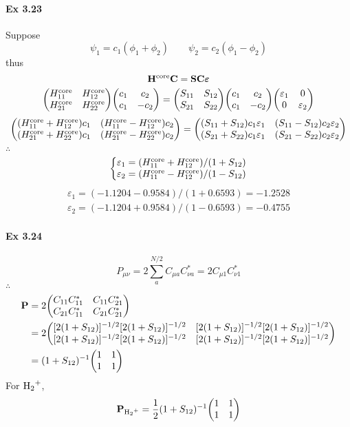 \documentclass[a4paper]{article}
\DeclareMathOperator{\core}{\mathrm{core}}
\newcommand{\ex}[1]{\paragraph{Ex #1}}
\numberwithin{equation}{subsection}
\begin{document}
\ex{3.23}
Suppose
\begin{equation}\label{key}
\psi_1 = c_1 (\phi_1 + \phi_2) \qquad \psi_2 = c_2 (\phi_1 - \phi_2)
\end{equation}
thus
\begin{equation}\label{key}
\vb{H}^{\core} \vb{C} = \vb{S} \vb{C} \bm\varepsilon
\end{equation}
\begin{equation}\label{key}
\mqty(H_{11}^{\core} & H_{12}^{\core}\\ H_{21}^{\core} & H_{22}^{\core}) \mqty(c_1 & c_2\\ c_1 & -c_2) = \mqty(S_{11} & S_{12}\\ S_{21} & S_{22}) \mqty(c_1 & c_2\\ c_1 & -c_2) \mqty(\varepsilon_1 & 0\\ 0 &\varepsilon_2 ) 
\end{equation}
\begin{equation}\label{key}
\mqty((H_{11}^{\core} + H_{12}^{\core}) c_1 & (H_{11}^{\core} - H_{12}^{\core}) c_2 \\ 
(H_{21}^{\core} + H_{22}^{\core}) c_1 & (H_{21}^{\core} - H_{22}^{\core})c_2)
= \mqty((S_{11} + S_{12}) c_1\varepsilon_1 & (S_{11} - S_{12}) c_2\varepsilon_2\\
(S_{21} + S_{22}) c_1\varepsilon_1 & (S_{21} - S_{22}) c_2\varepsilon_2)
\end{equation}
$ \therefore $
\begin{equation}\label{key}
\left\{ \mqty{\varepsilon_1 = (H_{11}^{\core} + H_{12}^{\core})/(1 + S_{12}) \\
\varepsilon_2 = (H_{11}^{\core} - H_{12}^{\core})/(1 - S_{12})}
\right.
\end{equation}
\begin{align}
\varepsilon_1 = (-1.1204-0.9584)/(1+0.6593) = -1.2528\\
\varepsilon_2 = (-1.1204+0.9584)/(1-0.6593) = -0.4755
\end{align}

\ex{3.24}
\begin{equation}\label{key}
P_{\mu\nu} = 2\sum_a^{N/2} C_{\mu a}C_{\nu a}^* = 2 C_{\mu 1}C_{\nu 1}^*
\end{equation}
$ \therefore $
\begin{align}
\vb{P} &= 2 \mqty( C_{11}C_{11}^* & C_{11}C_{21}^*\\
                   C_{21}C_{11}^* & C_{21}C_{21}^*) \notag\\
&= 2 \mqty([2(1+S_{12})]^{-1/2}[2(1+S_{12})]^{-1/2} & [2(1+S_{12})]^{-1/2}[2(1+S_{12})]^{-1/2} \\ [2(1+S_{12})]^{-1/2}[2(1+S_{12})]^{-1/2} & [2(1+S_{12})]^{-1/2}[2(1+S_{12})]^{-1/2} ) \notag\\
&= (1+S_{12})^{-1} \mqty(1 & 1 \\ 1 & 1)
\end{align}
For $ \ce{H_2^+} $,
\begin{equation}\label{key}
\vb{P}_{\ce{H_2^+}} = \dfrac{1}{2} (1+S_{12})^{-1} \mqty(1 & 1 \\ 1 & 1)
\end{equation}
\end{document}
